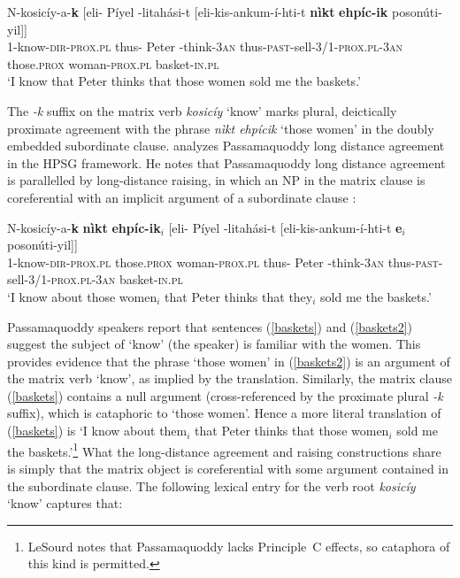 \documentclass[output=paper
                ,modfonts
                ,nonflat
	        ,collection
	        ,collectionchapter
	        ,collectiontoclongg
 	        ,biblatex
                ,babelshorthands
                ,newtxmath
                ,draftmode
                ,colorlinks, citecolor=brown
]{./langsci/langscibook}
\begin{document}
{\begin{exe}
\ex\label{baskets}
\gll N-kosic\'{i}y-a-\textbf{k}  [eli- P\'{i}yel -litah\'{a}si-t           {[eli-kis-ankum-\'{i}-hti-t}   \textbf{n\`{i}kt}  \textbf{ehp\'{i}c-ik}	{poson\'{u}ti-yil]]} \\
     1-know-\textsc{dir-prox.pl} \spacebr{}thus- Peter -think-\textsc{3an} { \spacebr{}thus-\textsc{past}-sell-\textsc{3/1-prox.pl-3an}}         those.\textsc{prox}  woman-\textsc{prox.pl}     basket-\textsc{in.pl}\\
\glt `I know that Peter thinks that those women sold me the baskets.’
\end{exe}

\noindent
The \textit{-k} suffix on the matrix verb \textit{kosic\'{i}y} `know' marks plural, deictically proximate agreement with the phrase \textit{n\`{i}kt ehp\'{i}cik} `those women'  in the doubly embedded subordinate clause.  \citet{LeSourd:2018} analyzes Passamaquoddy long distance agreement in the HPSG framework.   He notes that  Passamaquoddy long distance agreement is parallelled by long-distance raising, in which an NP in the matrix clause is coreferential with an implicit argument of a subordinate clause \citep[example\,(4)]{LeSourd:2018}:  

\begin{exe}
\ex\label{baskets2}
\gll N-kosic\'{i}y-a-\textbf{k} \textbf{n\`{i}kt}  \textbf{ehp\'{i}c-ik}$_i$ [eli- P\'{i}yel -litah\'{a}si-t  [eli-kis-ankum-\'{i}-hti-t  \textbf{e$_i$} 	{poson\'{u}ti-yil]]} \\
     1-know-\textsc{dir-prox.pl} those.\textsc{prox}  woman-\textsc{prox.pl} \spacebr{}thus- Peter -think-\textsc{3an} \spacebr{}thus-\textsc{past}-sell-\textsc{3/1-prox.pl-3an}         {}    basket-\textsc{in.pl}\\
\glt `I know about those women$_i$ that Peter thinks that they$_i$ sold me the baskets.’
\end{exe}

\noindent
Passamaquoddy speakers report that sentences (\ref{baskets}) and (\ref{baskets2}) suggest the subject of `know' (the speaker) is familiar with the women.  This provides evidence that the phrase `those women' in (\ref{baskets2}) is an argument of the matrix verb `know', as implied by the translation.  
Similarly, the matrix clause (\ref{baskets}) contains a null argument (cross-referenced by the proximate plural \textit{-k}  suffix), which is  cataphoric to `those women'.  Hence a more literal translation of (\ref{baskets}) is `I know about them$_i$ that Peter thinks that those women$_i$ sold me the baskets.'\footnote{LeSourd notes that Passamaquoddy lacks Principle~C effects, so cataphora of this kind is permitted.}  What the long-distance agreement and raising constructions share is simply that the matrix object is coreferential with some argument contained in the subordinate clause.  The following lexical entry for the verb root \textit{kosic\'{i}y} `know' captures that:

}
\end{document}
